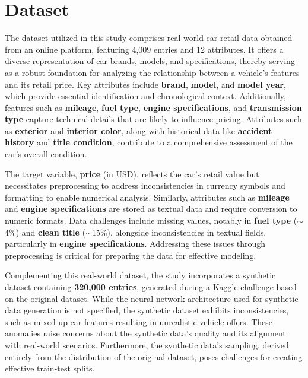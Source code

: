 \documentclass[a4paper,oneside,bibliography=totoc]{scrbook}
\begin{document}
\section{Dataset}
\label{sec:dataset}

The dataset utilized in this study comprises real-world car retail data obtained from an online platform, featuring 4,009 entries and 12 attributes. It offers a diverse representation of car brands, models, and specifications, thereby serving as a robust foundation for analyzing the relationship between a vehicle's features and its retail price. Key attributes include \textbf{brand}, \textbf{model}, and \textbf{model year}, which provide essential identification and chronological context. Additionally, features such as \textbf{mileage}, \textbf{fuel type}, \textbf{engine specifications}, and \textbf{transmission type} capture technical details that are likely to influence pricing. Attributes such as \textbf{exterior} and \textbf{interior color}, along with historical data like \textbf{accident history} and \textbf{title condition}, contribute to a comprehensive assessment of the car's overall condition.

The target variable, \textbf{price} (in USD), reflects the car's retail value but necessitates preprocessing to address inconsistencies in currency symbols and formatting to enable numerical analysis. Similarly, attributes such as \textbf{mileage} and \textbf{engine specifications} are stored as textual data and require conversion to numeric formats. Data challenges include missing values, notably in \textbf{fuel type} ($\sim$4\%) and \textbf{clean title} ($\sim$15\%), alongside inconsistencies in textual fields, particularly in \textbf{engine specifications}. Addressing these issues through preprocessing is critical for preparing the data for effective modeling.

Complementing this real-world dataset, the study incorporates a synthetic dataset containing \textbf{320,000 entries}, generated during a Kaggle challenge based on the original dataset. While the neural network architecture used for synthetic data generation is not specified, the synthetic dataset exhibits inconsistencies, such as mixed-up car features resulting in unrealistic vehicle offers. These anomalies raise concerns about the synthetic data's quality and its alignment with real-world scenarios. Furthermore, the synthetic data's sampling, derived entirely from the distribution of the original dataset, poses challenges for creating effective train-test splits.
\end{document}
